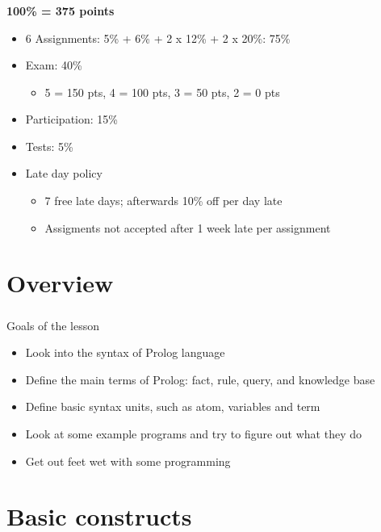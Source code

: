 \begin{frame}
	\frametitle{\insertsection}
	
	\textbf{100\% = 375 points}
	
	\begin{itemize}
		\item 6 Assignments: 5\% + 6\% + 2 x 12\% + 2 x 20\%: 75\%
		\item Exam: 40\%
		\begin{itemize}
			\item 5 = 150 pts, 4 = 100 pts, 3 = 50 pts, 2 = 0 pts
		\end{itemize}
		\item Participation: 15\%
		\item Tests: 5\%
		\item Late day policy
		\begin{itemize}
			\item 7 free late days; afterwards 10\% off per day late
			\item Assigments not accepted after 1 week late per assignment
		\end{itemize}
	\end{itemize}
	
\end{frame}


\section{Overview}

\begin{frame}
	\frametitle{\insertsection}
	Goals of the lesson
	\begin{itemize}
		\item Look into the syntax of Prolog language
		\item Define the main terms of Prolog: fact, rule, query, and knowledge base
		\item Define basic syntax units, such as atom, variables and term
		\item Look at some example programs and try to figure out what they do
		\item Get out feet wet with some programming
	\end{itemize}
\end{frame}


\section{Basic constructs}

